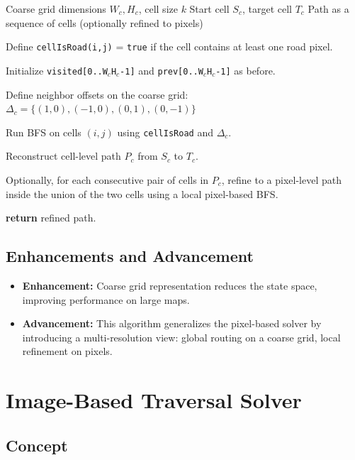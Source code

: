 \documentclass[11pt]{article}
\begin{document}
\begin{algorithm}[h!]
\caption{Grid-Based Neighbor Solver}
\begin{algorithmic}[1]
\Require Coarse grid dimensions $W_c,H_c$, cell size $k$
\Require Start cell $S_c$, target cell $T_c$
\Ensure Path as a sequence of cells (optionally refined to pixels)

\State Define \texttt{cellIsRoad(i,j)} = \texttt{true} if the cell
contains at least one road pixel.

\State Initialize \texttt{visited[0..W$_c$H$_c$-1]} and
\texttt{prev[0..W$_c$H$_c$-1]} as before.

\State Define neighbor offsets on the coarse grid:
\State \hspace{1em} $\Delta_c = \{(1,0),(-1,0),(0,1),(0,-1)\}$

\State Run BFS on cells $(i,j)$ using \texttt{cellIsRoad} and $\Delta_c$.

\State Reconstruct cell-level path $P_c$ from $S_c$ to $T_c$.

\State Optionally, for each consecutive pair of cells in $P_c$, refine
to a pixel-level path inside the union of the two cells using a local
pixel-based BFS.

\State \textbf{return} refined path.
\end{algorithmic}
\end{algorithm}

\subsection{Enhancements and Advancement}

\begin{itemize}
  \item \textbf{Enhancement:} Coarse grid representation reduces the
  state space, improving performance on large maps.
  \item \textbf{Advancement:} This algorithm generalizes the pixel-based
  solver by introducing a multi-resolution view: global routing on a
  coarse grid, local refinement on pixels.
\end{itemize}
\clearpage
\section{Image-Based Traversal Solver}
\label{sec:image_traversal}

\subsection{Concept}
\end{document}
